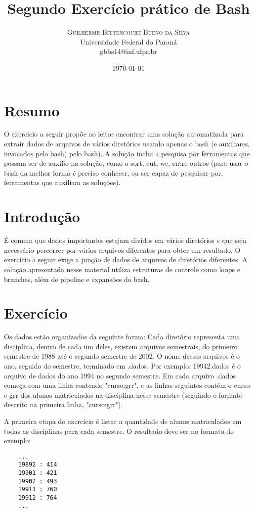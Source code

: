 \documentclass[oneside, 11 pt]{article}
\title{Segundo Exercício prático de Bash} %
\author{%
	\textsc{Guilherme Bittencourt Bueno da Silva} \\[1ex] %
	\normalsize Universidade Federal do Paraná \\ %
	\normalsize {gbbs14@inf.ufpr.br} %
}
\date{\today} %
\begin{document}
	
	\maketitle
	
	\section{Resumo}
	O exercício a seguir propõe ao leitor encontrar uma solução automatizada para extrair dados de arquivos de vários diretórios usando apenas o bash (e auxiliares, invocados pelo bash) pelo bash). A solução inclui a pesquisa por ferramentas que possam ser de auxílio na solução, como o sort, cut, wc, entre outros (para usar o bash da melhor forma é preciso conhecer, ou ser capaz de pesquisar por, ferramentas que auxiliam as soluções).
	
	\section{Introdução}
	É comum que dados importantes estejam dividos em vários diretórios e que seja necessário percorrer por vários arquivos diferentes para obter um resultado. O exercício a seguir exige a junção de dados de arquivos de diretórios diferentes. A solução apresentada nesse material utiliza estruturas de controle como loops e branches, além de pipeline e expansões do bash.
	
	\section{Exercício}
	Os dados estão organizados da seguinte forma: Cada diretório representa uma disciplina, dentro de cada um deles, existem arquivos semestrais, do primeiro semestre de 1988 até o segundo semestre de 2002. O nome desses arquivos é o ano, seguido do semestre, terminado em .dados. Por exemplo: 19942.dados é o arquivo de dados do ano 1994 no segundo semestre. Em cada arquivo .dados começa com uma linha contendo "curso:grr", e as linhas seguintes contém o curso e grr dos alunos matriculados na disciplina nesse semestre (seguindo o formato descrito na primeira linha, "curso:grr").
	
	A primeira etapa do exercício é listar a quantidade de alunos matriculados em todas as disciplinas para cada semestre. O resultado deve ser no formato do exemplo:
	
	\begin{lstlisting}
	...
	19892 : 414
	19901 : 421
	19902 : 493
	19911 : 760
	19912 : 764
	...
	\end{lstlisting}
	
\end{document}
